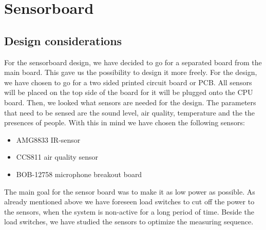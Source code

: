 \documentclass[11pt,a4paper]{article}
\begin{document}
\section{Sensorboard}
\subsection{Design considerations}
For the sensorboard design, we have decided to go for a separated board from the main board. This gave us the possibility to design it more freely. For the design, we have chosen to go for a two sided printed circuit board or PCB. All sensors will be placed on the top side of the board for it will be plugged onto the CPU board. Then, we looked what sensors are needed for the design. The parameters that need to be sensed are the sound level, air quality, temperature and the the presences of people.
With this in mind we have chosen the following sensors:
\begin{itemize}
	\item AMG8833 IR-sensor
	\item CCS811 air quality sensor
	\item BOB-12758 microphone breakout board
\end{itemize}
The main goal for the sensor board was to make it as low power as possible. As already mentioned above we have foreseen load switches to cut off the power to the sensors, when the system is non-active for a long period of time. Beside the load switches, we have studied the sensors to optimize the measuring sequence.
\end{document}
